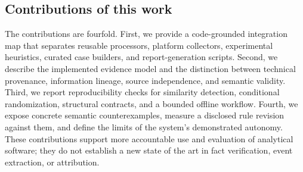 \subsection{Contributions of this work}
The contributions are fourfold. First, we provide a code-grounded integration map that separates reusable processors, platform collectors, experimental heuristics, curated case builders, and report-generation scripts. Second, we describe the implemented evidence model and the distinction between technical provenance, information lineage, source independence, and semantic validity. Third, we report reproducibility checks for similarity detection, conditional randomization, structural contracts, and a bounded offline workflow. Fourth, we expose concrete semantic counterexamples, measure a disclosed rule revision against them, and define the limits of the system's demonstrated autonomy. These contributions support more accountable use and evaluation of analytical software; they do not establish a new state of the art in fact verification, event extraction, or attribution.
